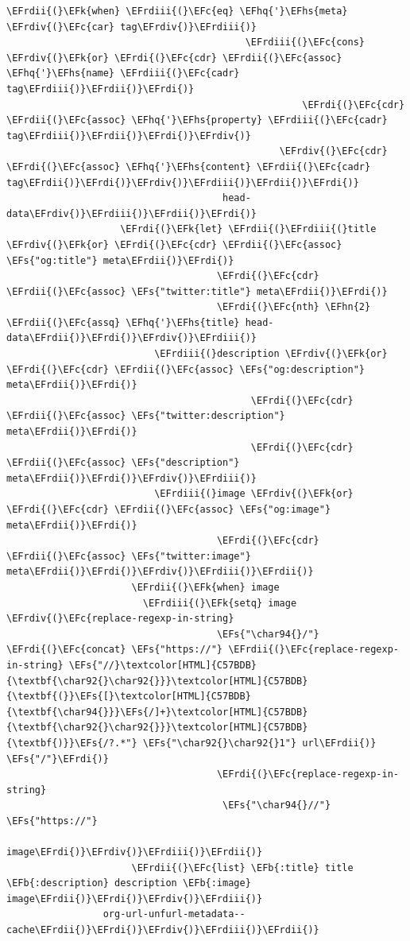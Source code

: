 \documentclass{scrartcl}
\newcommand{\EFk}[1]{\textcolor{EFk}{#1}} %
\newcommand{\EFs}[1]{\textcolor{EFs}{#1}} %
\newcommand{\EFb}[1]{\textcolor{EFb}{#1}} %
\newcommand{\EFc}[1]{\textcolor{EFc}{#1}} %
\newcommand{\EFhn}[1]{#1} %
\newcommand{\EFhq}[1]{#1} %
\newcommand{\EFhs}[1]{#1} %
\newcommand{\EFrdi}[1]{#1} %
\newcommand{\EFrdii}[1]{#1} %
\newcommand{\EFrdiii}[1]{#1} %
\newcommand{\EFrdiv}[1]{#1} %
\begin{document}
\begin{Code}
\begin{Verbatim}[]
                                        \EFrdii{(}\EFk{when} \EFrdiii{(}\EFc{eq} \EFhq{'}\EFhs{meta} \EFrdiv{(}\EFc{car} tag\EFrdiv{)}\EFrdiii{)}
                                          \EFrdiii{(}\EFc{cons} \EFrdiv{(}\EFk{or} \EFrdi{(}\EFc{cdr} \EFrdii{(}\EFc{assoc} \EFhq{'}\EFhs{name} \EFrdiii{(}\EFc{cadr} tag\EFrdiii{)}\EFrdii{)}\EFrdi{)}
                                                    \EFrdi{(}\EFc{cdr} \EFrdii{(}\EFc{assoc} \EFhq{'}\EFhs{property} \EFrdiii{(}\EFc{cadr} tag\EFrdiii{)}\EFrdii{)}\EFrdi{)}\EFrdiv{)}
                                                \EFrdiv{(}\EFc{cdr} \EFrdi{(}\EFc{assoc} \EFhq{'}\EFhs{content} \EFrdii{(}\EFc{cadr} tag\EFrdii{)}\EFrdi{)}\EFrdiv{)}\EFrdiii{)}\EFrdii{)}\EFrdi{)}
                                      head-data\EFrdiv{)}\EFrdiii{)}\EFrdii{)}\EFrdi{)}
                    \EFrdi{(}\EFk{let} \EFrdii{(}\EFrdiii{(}title \EFrdiv{(}\EFk{or} \EFrdi{(}\EFc{cdr} \EFrdii{(}\EFc{assoc} \EFs{"og:title"} meta\EFrdii{)}\EFrdi{)}
                                     \EFrdi{(}\EFc{cdr} \EFrdii{(}\EFc{assoc} \EFs{"twitter:title"} meta\EFrdii{)}\EFrdi{)}
                                     \EFrdi{(}\EFc{nth} \EFhn{2} \EFrdii{(}\EFc{assq} \EFhq{'}\EFhs{title} head-data\EFrdii{)}\EFrdi{)}\EFrdiv{)}\EFrdiii{)}
                          \EFrdiii{(}description \EFrdiv{(}\EFk{or} \EFrdi{(}\EFc{cdr} \EFrdii{(}\EFc{assoc} \EFs{"og:description"} meta\EFrdii{)}\EFrdi{)}
                                           \EFrdi{(}\EFc{cdr} \EFrdii{(}\EFc{assoc} \EFs{"twitter:description"} meta\EFrdii{)}\EFrdi{)}
                                           \EFrdi{(}\EFc{cdr} \EFrdii{(}\EFc{assoc} \EFs{"description"} meta\EFrdii{)}\EFrdi{)}\EFrdiv{)}\EFrdiii{)}
                          \EFrdiii{(}image \EFrdiv{(}\EFk{or} \EFrdi{(}\EFc{cdr} \EFrdii{(}\EFc{assoc} \EFs{"og:image"} meta\EFrdii{)}\EFrdi{)}
                                     \EFrdi{(}\EFc{cdr} \EFrdii{(}\EFc{assoc} \EFs{"twitter:image"} meta\EFrdii{)}\EFrdi{)}\EFrdiv{)}\EFrdiii{)}\EFrdii{)}
                      \EFrdii{(}\EFk{when} image
                        \EFrdiii{(}\EFk{setq} image \EFrdiv{(}\EFc{replace-regexp-in-string}
                                     \EFs{"\char94{}/"} \EFrdi{(}\EFc{concat} \EFs{"https://"} \EFrdii{(}\EFc{replace-regexp-in-string} \EFs{"//}\textcolor[HTML]{C57BDB}{\textbf{\char92{}\char92{}}}\textcolor[HTML]{C57BDB}{\textbf{(}}\EFs{[}\textcolor[HTML]{C57BDB}{\textbf{\char94{}}}\EFs{/]+}\textcolor[HTML]{C57BDB}{\textbf{\char92{}\char92{}}}\textcolor[HTML]{C57BDB}{\textbf{)}}\EFs{/?.*"} \EFs{"\char92{}\char92{}1"} url\EFrdii{)} \EFs{"/"}\EFrdi{)}
                                     \EFrdi{(}\EFc{replace-regexp-in-string}
                                      \EFs{"\char94{}//"} \EFs{"https://"}
                                      image\EFrdi{)}\EFrdiv{)}\EFrdiii{)}\EFrdii{)}
                      \EFrdii{(}\EFc{list} \EFb{:title} title \EFb{:description} description \EFb{:image} image\EFrdii{)}\EFrdi{)}\EFrdiv{)}\EFrdiii{)}
                 org-url-unfurl-metadata--cache\EFrdii{)}\EFrdi{)}\EFrdiv{)}\EFrdiii{)}\EFrdii{)}


\end{Verbatim}
\end{Code}
\end{document}
